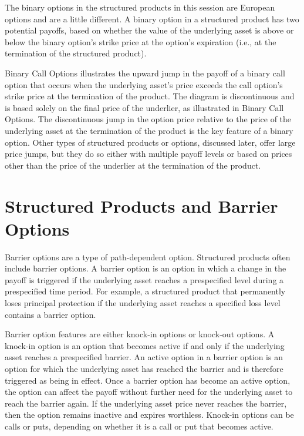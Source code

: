 \documentclass[11pt]{article}
\begin{document}
The binary options in the structured products in this session are European options and are a little different. A binary option in a structured product has two potential payoffs, based on whether the value of the underlying asset is above or below the binary option's strike price at the option's expiration (i.e., at the termination of the structured product).

Binary Call Options illustrates the upward jump in the payoff of a binary call option that occurs when the underlying asset's price exceeds the call option's strike price at the termination of the product. The diagram is discontinuous and is based solely on the final price of the underlier, as illustrated in Binary Call Options. The discontinuous jump in the option price relative to the price of the underlying asset at the termination of the product is the key feature of a binary option. Other types of structured products or options, discussed later, offer large price jumps, but they do so either with multiple payoff levels or based on prices other than the price of the underlier at the termination of the product.

\section*{Structured Products and Barrier Options}
Barrier options are a type of path-dependent option. Structured products often include barrier options. A barrier option is an option in which a change in the payoff is triggered if the underlying asset reaches a prespecified level during a prespecified time period. For example, a structured product that permanently loses principal protection if the underlying asset reaches a specified loss level contains a barrier option.

Barrier option features are either knock-in options or knock-out options. A knock-in option is an option that becomes active if and only if the underlying asset reaches a prespecified barrier. An active option in a barrier option is an option for which the underlying asset has reached the barrier and is therefore triggered as being in effect. Once a barrier option has become an active option, the option can affect the payoff without further need for the underlying asset to reach the barrier again. If the underlying asset price never reaches the barrier, then the option remains inactive and expires worthless. Knock-in options can be calls or puts, depending on whether it is a call or put that becomes active.
\end{document}
